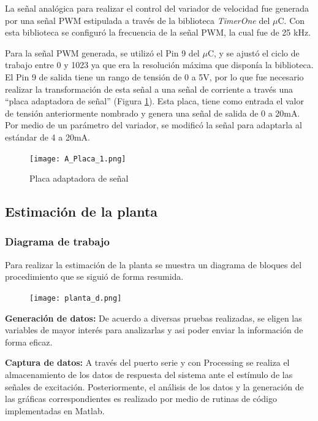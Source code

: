 La señal analógica para realizar el control del variador de velocidad fue generada por una señal PWM estipulada a través de la biblioteca \textit{TimerOne} del $\mu$C. Con esta biblioteca se configuró la frecuencia de la señal PWM, la cual fue de 25 kHz. 

Para la señal PWM generada, se utilizó el Pin 9 del $\mu$C, y se ajustó el ciclo de trabajo entre 0 y 1023 ya que era la resolución máxima que disponía la biblioteca. El Pin 9 de salida tiene un rango de tensión de 0 a 5V, por lo que fue necesario realizar la transformación de esta señal a una señal de corriente a través una “placa adaptadora de señal” (Figura \ref{fig:adapt}). Esta placa, tiene como entrada el valor de tensión anteriormente nombrado y genera una señal de salida de 0 a 20mA. Por medio de un parámetro del variador, se modificó la señal para adaptarla al estándar de 4 a 20mA.


\begin{figure}[htbp]
	\centering
	\texttt{[image: A\_Placa\_1.png]}
	\caption{Placa adaptadora de señal}
	\label{fig:adapt}
\end{figure}



\subsection{Estimación de la planta} \label{sec:estima}
    \subsubsection{Diagrama de trabajo}

Para realizar la estimación de la planta se muestra un diagrama de bloques del procedimiento que se siguió de forma resumida.

\begin{figure}[htb]
	\centering
	\texttt{[image: planta\_d.png]}
	\label{fig:planta_d}
\end{figure}

 \textbf{Generación de datos:} De acuerdo a diversas pruebas realizadas, se eligen las variables de mayor interés para analizarlas y asi poder enviar la información de forma eficaz.

 \textbf{Captura de datos:} A través del puerto serie y con Processing se realiza el almacenamiento de los datos de respuesta del sistema ante el estímulo de las señales de excitación. Posteriormente, el análisis de los datos y la generación de las gráficas correspondientes es realizado por medio de rutinas de código implementadas en Matlab.

